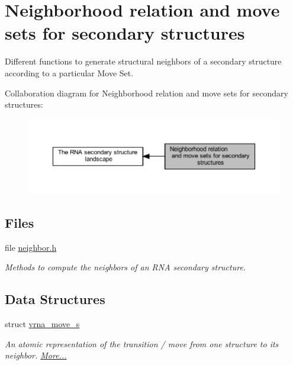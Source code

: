 \hypertarget{group__neighbors}{}\section{Neighborhood relation and move sets for secondary structures}
\label{group__neighbors}


Different functions to generate structural neighbors of a secondary structure according to a particular Move Set.  


Collaboration diagram for Neighborhood relation and move sets for secondary structures\+:
\nopagebreak
\begin{figure}[H]
\begin{center}
\leavevmode
\includegraphics[width=350pt]{group__neighbors}
\end{center}
\end{figure}
\subsection*{Files}
\begin{DoxyCompactItemize}
\item 
file \hyperlink{neighbor_8h}{neighbor.\+h}
\begin{DoxyCompactList}\small\item\em Methods to compute the neighbors of an R\+NA secondary structure. \end{DoxyCompactList}\end{DoxyCompactItemize}
\subsection*{Data Structures}
\begin{DoxyCompactItemize}
\item 
struct \hyperlink{group__neighbors_structvrna__move__s}{vrna\+\_\+move\+\_\+s}
\begin{DoxyCompactList}\small\item\em An atomic representation of the transition / move from one structure to its neighbor.  \hyperlink{group__neighbors_structvrna__move__s}{More...}\end{DoxyCompactList}\end{DoxyCompactItemize}
